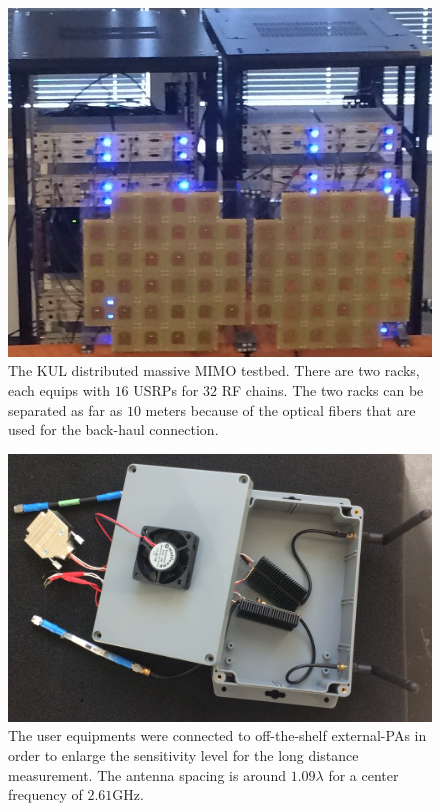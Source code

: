 \begin{figure}[t!]
	\centering
	\includegraphics[width=1\linewidth]{figures/BSArrays.png}
	\caption{The KUL distributed massive MIMO testbed. There are two racks, each equips with $16$ USRPs for $32$ RF chains. The two racks can be separated as far as $10$ meters because of the optical fibers that  are used for the back-haul connection.}
	\label{fig:BSArrays}
\end{figure}
\begin{figure}[t!]
	\centering
	\includegraphics[width=1\linewidth]{figures/user_equipment.PNG}
	\caption{The user equipments were connected to off-the-shelf external-PAs in order to enlarge the sensitivity level for the long distance measurement. The antenna spacing is around $1.09\lambda$ for a center frequency of $2.61$GHz.}
	\label{fig:UserEquipment}
\end{figure}

